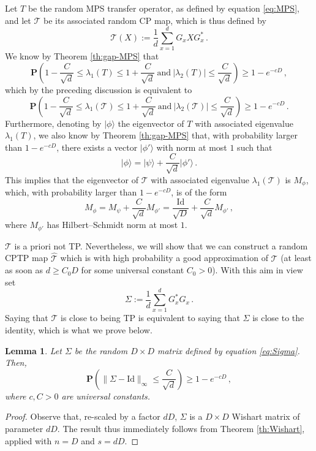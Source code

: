 \documentclass{amsart}
\newtheorem{lemma}[theorem]{Lemma}
\renewcommand{\P}{\mathbf{P}}
\renewcommand{\leq}{\leqslant}
\renewcommand{\geq}{\geqslant}
\newcommand{\Id}{\mathrm{Id}}
\newcommand{\ket}[1]{| #1 \rangle}
\begin{document}
Let $T$ be the random MPS transfer operator, as defined by equation \eqref{eq:MPS}, and let $\mathcal{T}$ be its associated random CP map, which is thus defined by
\begin{equation} \label{eq:CalT}
    \mathcal{T}(X) := \frac{1}{d} \sum_{x=1}^d G_x X G_x^* \, .
\end{equation}
We know by Theorem \ref{th:gap-MPS} that
\[ \P\left( 1-\frac{C}{\sqrt{d}} \leq \lambda_1(T) \leq 1+\frac{C}{\sqrt{d}} \ \text{and} \ |\lambda_2(T)|\leq \frac{C}{\sqrt{d}} \right) \geq 1-e^{-cD} \, ,  \]
which by the preceding discussion is equivalent to
\[ \P\left( 1-\frac{C}{\sqrt{d}} \leq \lambda_1(\mathcal{T}) \leq 1+\frac{C}{\sqrt{d}} \ \text{and} \ |\lambda_2(\mathcal{T})|\leq \frac{C}{\sqrt{d}} \right) \geq 1-e^{-cD} \, .  \]
Furthermore, denoting by $\ket{\phi}$ the eigenvector of $T$ with associated eigenvalue $\lambda_1(T)$, we also know by Theorem \ref{th:gap-MPS} that, with probability larger than $1-e^{-cD}$, there exists a vector $\ket{\phi'}$ with norm at most $1$ such that
\[ \ket{\phi} = \ket{\psi} + \frac{C}{\sqrt{d}}\ket{\phi'} \, . \]
This implies that the eigenvector of $\mathcal{T}$ with associated eigenvalue $\lambda_1(\mathcal{T})$ is $M_{\phi}$, which, with probability larger than $1-e^{-cD}$, is of the form
\[ M_{\phi} = M_{\psi} + \frac{C}{\sqrt{d}}M_{\phi'} = \frac{\Id}{\sqrt{D}} + \frac{C}{\sqrt{d}}M_{\phi'} \, , \]
where $M_{\phi'}$ has Hilbert--Schmidt norm at most $1$.

$\mathcal{T}$ is a priori not TP. Nevertheless, we will show that we can construct a random CPTP map $\hat{\mathcal{T}}$ which is with high probability a good approximation of $\mathcal{T}$ (at least as soon as $d\geq C_0D$ for some universal constant $C_0>0$). With this aim in view set
\begin{equation} \label{eq:Sigma}
    \Sigma := \frac{1}{d} \sum_{x=1}^d G_x^*G_x \, .
\end{equation}
Saying that $\mathcal{T}$ is close to being TP is equivalent to saying that $\Sigma$ is close to the identity, which is what we prove below.

\begin{lemma} \label{lem:Sigma}
    Let $\Sigma$ be the random $D\times D$ matrix defined by equation \eqref{eq:Sigma}. Then,
    \[ \P\left( \|\Sigma-\Id\|_{\infty} \leq \frac{C}{\sqrt{d}} \right) \geq 1-e^{-cD} \, , \]
    where $c,C>0$ are universal constants.
\end{lemma}

\begin{proof}
    Observe that, re-scaled by a factor $dD$, $\Sigma$ is a $D\times D$ Wishart matrix of parameter $dD$. The result thus immediately follows from Theorem \ref{th:Wishart}, applied with $n=D$ and $s=dD$.
\end{proof}
\end{document}
